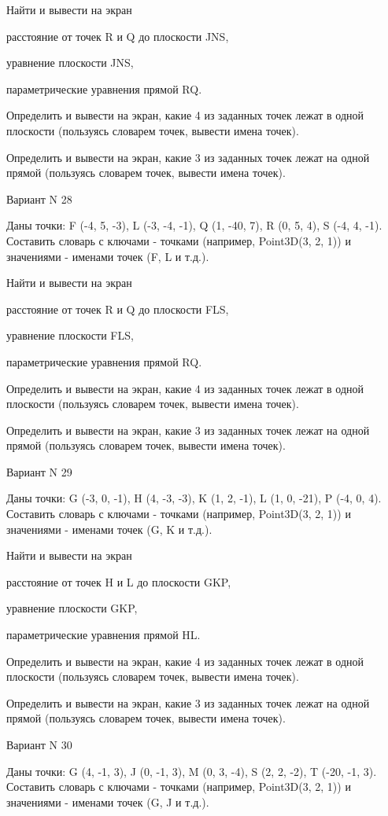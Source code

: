 \documentclass[11pt]{report}
\begin{document}
Найти и вывести на экран


расстояние от точек R и Q до плоскости JNS,


уравнение плоскости JNS,


параметрические уравнения прямой RQ.


Определить и вывести на экран, какие 4 из заданных точек лежат в одной плоскости (пользуясь словарем точек, вывести имена точек).


Определить и вывести на экран, какие 3 из заданных точек лежат на одной прямой (пользуясь словарем точек, вывести имена точек).

\newpage
Вариант N 28

Даны точки: F (-4, 5, -3), L (-3, -4, -1), Q (1, -40, 7), R (0, 5, 4), S (-4, 4, -1).
Составить словарь с ключами - точками (например, Point3D(3, 2, 1)) и значениями - именами точек (F, L и т.д.).


Найти и вывести на экран


расстояние от точек R и Q до плоскости FLS,


уравнение плоскости FLS,


параметрические уравнения прямой RQ.


Определить и вывести на экран, какие 4 из заданных точек лежат в одной плоскости (пользуясь словарем точек, вывести имена точек).


Определить и вывести на экран, какие 3 из заданных точек лежат на одной прямой (пользуясь словарем точек, вывести имена точек).

\newpage
Вариант N 29

Даны точки: G (-3, 0, -1), H (4, -3, -3), K (1, 2, -1), L (1, 0, -21), P (-4, 0, 4).
Составить словарь с ключами - точками (например, Point3D(3, 2, 1)) и значениями - именами точек (G, K и т.д.).


Найти и вывести на экран


расстояние от точек H и L до плоскости GKP,


уравнение плоскости GKP,


параметрические уравнения прямой HL.


Определить и вывести на экран, какие 4 из заданных точек лежат в одной плоскости (пользуясь словарем точек, вывести имена точек).


Определить и вывести на экран, какие 3 из заданных точек лежат на одной прямой (пользуясь словарем точек, вывести имена точек).

\newpage
Вариант N 30

Даны точки: G (4, -1, 3), J (0, -1, 3), M (0, 3, -4), S (2, 2, -2), T (-20, -1, 3).
Составить словарь с ключами - точками (например, Point3D(3, 2, 1)) и значениями - именами точек (G, J и т.д.).
\end{document}
